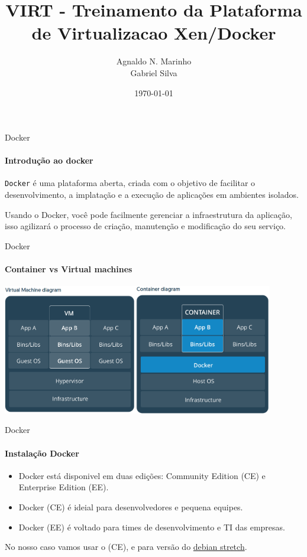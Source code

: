 \documentclass{beamer}
\title{VIRT - Treinamento da Plataforma de Virtualizacao Xen/Docker}
\subtitle{}
\date{\today}
\author{Agnaldo N. Marinho \\ Gabriel Silva}
\institute{\url{http://github.com/agnaldom}}
\begin{document}
\maketitle

\begin{frame}{Docker}
  \framesubtitle{Introdu\c{c}\~ao ao docker}

  \texttt{Docker} \'e uma plataforma aberta, criada com o objetivo de facilitar o desenvolvimento, 
  a implata\c{c}\~ao e a execu\c{c}\~ao de aplica\c{c}\~oes em ambientes isolados. 

  Usando o Docker, voc\^e pode facilmente gerenciar a infraestrutura da aplica\c{c}\~ao, isso agilizar\'a 
  o processo de cria\c{c}\~ao, manuten\c{c}\~ao e modifica\c{c}\~ao do seu servi\c{c}o.
\end{frame}

\begin{frame}{Docker}
    \framesubtitle{Container vs Virtual machines}
    \includegraphics[height=5.7cm]{img/vm.png}\includegraphics[width=6cm]{img/container.png}
\end{frame}

\begin{frame}{Docker}
    \framesubtitle{Instala\c{c}\~ao Docker}
    \begin{itemize}
        \item Docker est\'a disponivel em duas edi\c{c}\~oes: Community Edition (CE) e Enterprise Edition (EE).
        \item Docker (CE) \'e ideial para desenvolvedores e pequena equipes.
        \item Docker (EE) \'e voltado para times de desenvolvimento e TI das empresas.
    \end{itemize}
    No nosso caso vamos usar o (CE), e para vers\~ao do \href{https://docs.docker.com/engine/installation/linux/docker-ce/debian/}{debian stretch}.
\end{frame}
\end{document}
